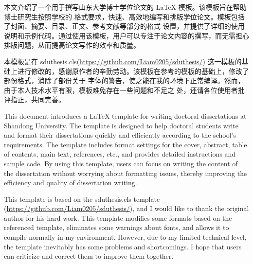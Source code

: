 
\begin{cnabstract}

    本文介绍了一个用于撰写山东大学博士学位论文的 \LaTeX{} 模板。该模板旨在帮助博士研究生按照学校的
    格式要求，快速、高效地编写和排版学位论文。模板包括了封面、摘要、目录、正文、参考文献等部分的格式
    设置，并提供了详细的使用说明和示例代码。通过使用该模板，用户可以专注于论文内容的撰写，而无需担心
    排版问题，从而提高论文写作的效率和质量。

    本模板是在 sduthesis.cls(\url{https://github.com/Liam0205/sduthesis/}) 这一模板的基
    础上进行修改的，感谢原作者的辛勤劳动。该模板在参考的模板的基础上，修改了部份格式，消除了部份关于
    字体的警告，使之能在我的环境下正常编译。然而，由于本人技术水平有限，模板难免存在一些问题和不足之
    处，还请各位使用者批评指正，共同完善。


\end{cnabstract}

\begin{enabstract}

    This document introduces a \LaTeX{} template for writing doctoral dissertations
    at Shandong University. The template is designed to help doctoral students
    write and format their dissertations quickly and efficiently according to the
    school's requirements. The template includes format settings for the cover,
    abstract, table of contents, main text, references, etc., and provides detailed
    instructions and sample code. By using this template, users can focus on
    writing the content of the dissertation without worrying about formatting
    issues, thereby improving the efficiency and quality of dissertation writing.

    This template is based on the sduthesis.cls template
    (\url{https://github.com/Liam0205/sduthesis/}), and I would like to thank the
    original author for his hard work. This template modifies some formats based on
    the referenced template, eliminates some warnings about fonts, and allows it to
    compile normally in my environment. However, due to my limited technical level,
    the template inevitably has some problems and shortcomings. I hope that users
    can criticize and correct them to improve them together.


\end{enabstract}